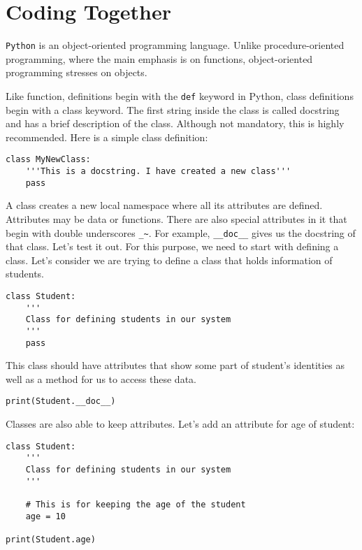\documentclass[11pt]{article}
\begin{document}
\section{Coding Together}
\label{sec:org05841fa}


\texttt{Python} is an object-oriented programming language. Unlike procedure-oriented
programming, where the main emphasis is on functions, object-oriented
programming stresses on objects.

Like function, definitions begin with the \texttt{def} keyword in Python, class
definitions begin with a class keyword. The first string inside the class is
called docstring and has a brief description of the class. Although not
mandatory, this is highly recommended. Here is a simple class definition:

\begin{verbatim}
class MyNewClass:
    '''This is a docstring. I have created a new class'''
    pass
\end{verbatim}

A class creates a new local namespace where all its attributes are defined.
Attributes may be data or functions. There are also special attributes in it
that begin with double underscores \texttt{\_\textasciitilde{}}. For example, \texttt{\_\_doc\_\_} gives us the
docstring of that class. Let's test it out. For this purpose, we need to start
with defining a class. Let's consider we are trying to define a class that holds
information of students.

\begin{verbatim}
class Student:
    '''
    Class for defining students in our system
    '''
    pass
\end{verbatim}


This class should have attributes that show some part of student's identities as
well as a method for us to access these data.

\begin{verbatim}
print(Student.__doc__)
\end{verbatim}

Classes are also able to keep attributes. Let's add an attribute for age of
student:

\begin{verbatim}
class Student:
    '''
    Class for defining students in our system
    '''

    # This is for keeping the age of the student
    age = 10

print(Student.age)
\end{verbatim}
\end{document}
